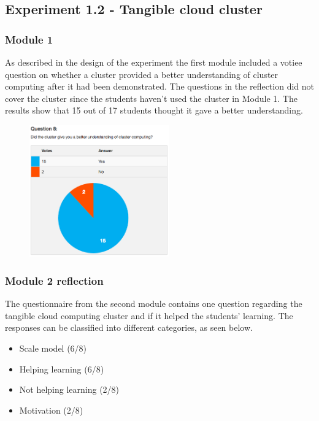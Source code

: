 \subsection*{Experiment 1.2 - Tangible cloud cluster}

\subsubsection*{Module 1}
As described in the design of the experiment the first module included a votiee question on whether a cluster provided a better understanding of cluster computing after it had been demonstrated. The questions in the reflection did not cover the cluster since the students haven't used the cluster in Module 1. The results show that 15 out of 17 students thought it gave a better understanding.
\begin{figure}[H]
	\centering
	\includegraphics[width=6cm]{figures/appendix/cluster_understanding}
	\label{}
\end{figure}


\subsubsection*{Module 2 reflection}
The questionnaire from the second module contains one question regarding the tangible cloud computing cluster and if it helped the students' learning. The responses can be classified into different categories, as seen below.

\begin{itemize}
	\item Scale model (6/8)
	\item Helping learning (6/8)
	\item Not helping learning (2/8)
	\item Motivation (2/8)
\end{itemize}

